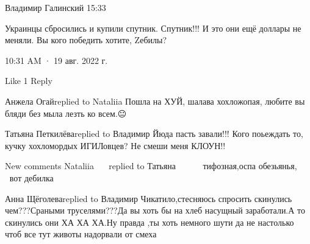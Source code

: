  
 
 
 
 


Владимир Галинский
15:33

Украинцы сбросились и купили спутник. Спутник!!! И это они ещё доллары не меняли. Вы кого победить хотите, Zебилы?

10:31 AM · 19 авг. 2022 г.

    Like 1
    Reply

Анжела Огайreplied to Nataliia
Пошла на ХУЙ, шалава хохложопая, любите вы бляди без мыла лезть ко всем.😐

Татьяна Петкилёваreplied to Владимир
Йюда пасть завали!!! Кого поьеждать то, кучку хохломордых ИГИЛовцев? Не смеши меня КЛОУН!!

New comments
Nataliia 💐🌻💐🌻💐replied to Татьяна
🤣🤣🤣🤣🤣🤣🤣🤣🤣 тифозная,оспа обезьянья,🤣🤣🤣🤣🤣🤣🤣🤣вот дебилка🤣🤣🤣🤣🤣🤣🤣🤣🤣🤣

Анна Щёголеваreplied to Владимир
Чикатило,стесняюсь спросить скинулись чем???Сраными труселями???Да вы хоть бы на хлеб насущный заработали.А то скинулись они ХА ХА ХА.Ну правда ,ты хоть немного шути да не настолько чтоб все тут животы надорвали от смеха
